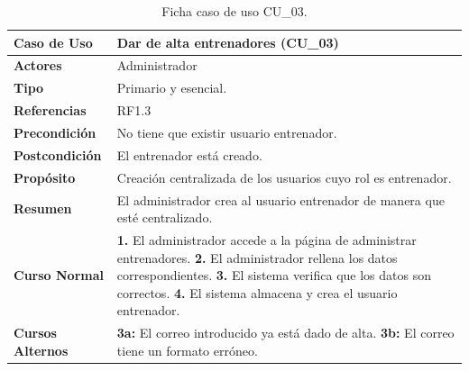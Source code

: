         \newpage
        \begin{table}[htbp]
        \centering
        \footnotesize
        \renewcommand{\arraystretch}{1.0}
        \begin{tabularx}{\textwidth}{|l|X|}
        \hline
        \rowcolor[HTML]{EFEFEF} 
        \textbf{Caso de Uso} & \textbf{Dar de alta entrenadores (CU\_03)} \\ \hline
        \textbf{Actores} & Administrador \\ \hline
        \textbf{Tipo} & Primario y esencial. \\ \hline
        \textbf{Referencias} & RF1.3 \\ \hline
        \textbf{Precondición} & No tiene que existir usuario entrenador. \\ \hline
        \textbf{Postcondición} & El entrenador está creado. \\ \hline
        \textbf{Propósito} & Creación centralizada de los usuarios cuyo rol es entrenador. \\ \hline
        \textbf{Resumen} & El administrador crea al usuario entrenador de manera que esté centralizado. \\ \hline
        \textbf{Curso Normal} & 
        \textbf{1.} El administrador accede a la página de administrar entrenadores.\newline
        \textbf{2.} El administrador rellena los datos correspondientes.\newline
        \textbf{3.} El sistema verifica que los datos son correctos.\newline
        \textbf{4.} El sistema almacena y crea el usuario entrenador. \\ \hline
        \textbf{Cursos Alternos} & 
        \textbf{3a:} El correo introducido ya está dado de alta.\newline
        \textbf{3b:} El correo tiene un formato erróneo. \\ \hline
        \end{tabularx}
        \caption{Ficha caso de uso CU\_03.}
        \label{tab:cu_03}
        \end{table}

